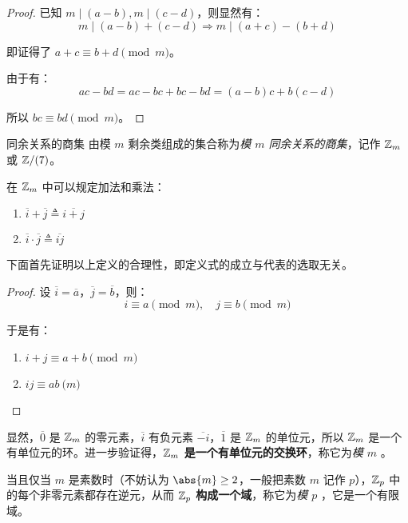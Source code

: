 \begin{proof}
	已知 $m \mid (a - b), m \mid (c - d)$，则显然有：
	$$
	m \mid (a - b) + (c - d) \Longrightarrow m \mid (a + c) - (b + d)
	$$

	即证得了 $a + c \equiv b + d \pmod{m}$。

	由于有：
	$$
	ac - bd = ac - bc + bc - bd = (a - b) c + b (c - d)
	$$

	所以 $bc \equiv bd \pmod{m}$。
\end{proof}

\begin{definition}{同余关系的商集}
	由模 $m$ 剩余类组成的集合称为\emph{模 $m$ 同余关系的商集}，记作 $\mathbb Z_m$ 或 $\mathbb Z / (7)$。
\end{definition}

在 $\mathbb Z_m$ 中可以规定加法和乘法：
\begin{enumerate}
	\item $\overline i + \overline j \triangleq \overline{i + j}$
	\item $\overline i \cdot \overline j \triangleq \overline {ij}$
\end{enumerate}

下面首先证明以上定义的合理性，即定义式的成立与代表的选取无关。

\begin{proof}
	设 $\overline i = \overline a$，$\overline j = \overline b$，则：
	$$
	i \equiv a \pmod{m}, \quad j \equiv b \pmod{m}
	$$

	于是有：
	\begin{enumerate}
		\item $i + j \equiv a + b \pmod{m}$
		\item $ij \equiv ab \pod{m}$
	\end{enumerate}
\end{proof}

显然，$\overline 0$ 是 $\mathbb Z_m$ 的零元素，$\overline i$ 有负元素 $\overline{-i}$，$\overline 1$ 是 $\mathbb Z_m$ 的单位元，所以 $\mathbb Z_m$ 是一个有单位元的环。进一步验证得，\textbf{$\mathbb Z_m$ 是一个有单位元的交换环}，称它为\emph{模 $m$ }。

当且仅当 $m$ 是素数时（不妨认为 $\abs{m} \ge 2$，一般把素数 $m$ 记作 $p$），$\mathbb Z_p$ 中的每个非零元素都存在逆元，从而 \textbf{$\mathbb Z_p$ 构成一个域}，称它为\emph{模 $p$ }，它是一个有限域。

